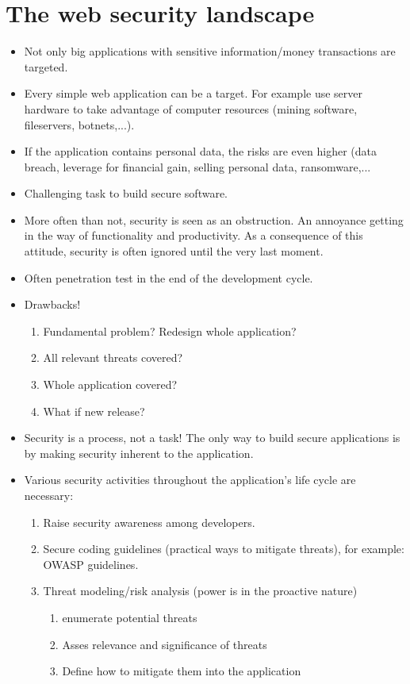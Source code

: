 \documentclass[../main.tex]{subfiles}
\begin{document}
\section{The web security landscape}
\begin{itemize}
\item Not only big applications with sensitive information/money transactions are targeted.
\item Every simple web application can be a target. For example use server hardware to take advantage of computer resources (mining software, fileservers, botnets,...).
\item If the application contains personal data, the risks are even higher (data breach, leverage for financial gain, selling personal data, ransomware,...
\item Challenging task to build secure software.
\item More often than not, security is seen as an obstruction. An annoyance getting in the way of functionality and productivity. As a consequence of this attitude, security is often ignored until the very last moment.
\item Often penetration test in the end of the development cycle.
\item Drawbacks!
\begin{enumerate}
\item Fundamental problem? Redesign whole application?
\item All relevant threats covered?
\item Whole application covered?
\item What if new release?
\end{enumerate}
\item Security is a process, not a task! The only way to build secure applications is by making security inherent to the application.
\item Various security activities throughout the application's life cycle are necessary:
\begin{enumerate}
\item Raise security awareness among developers.
\item Secure coding guidelines (practical ways to mitigate threats), for example: OWASP guidelines.
\item Threat modeling/risk analysis (power is in the proactive nature)
\begin{enumerate}
\item enumerate potential threats
\item Asses relevance and significance of threats
\item Define how to mitigate them into the application
\end{enumerate}
\end{enumerate}
\end{itemize}
\end{document}
